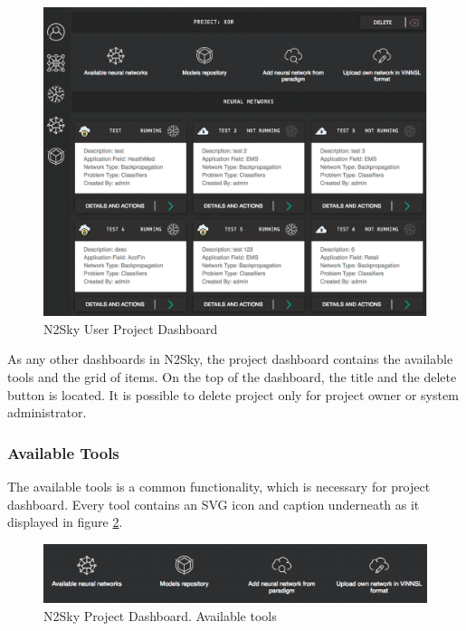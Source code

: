\begin{figure}[H]
\begin{center}
  \includegraphics[width=\linewidth]{components/5/img/projects_dsahboard.png}
  \caption{N2Sky User Project Dashboard}
  \label{fig:projects_dsahboard}
\end{center}
\end{figure}

As any other dashboards in N2Sky, the project dashboard contains the available tools and the grid of items.
On the top of the dashboard, the title and the delete button is located. It is possible to delete project only for project owner or system administrator. 

\subsubsection{Available Tools} 

The available tools is a common functionality, which is necessary for project dashboard. Every tool contains an SVG icon and caption underneath as it displayed in figure \ref{fig:projecttools}. 

\begin{figure}[htbp]
\begin{center}
  \includegraphics[width=\linewidth]{components/5/img/project_tools.png}
  \caption{N2Sky Project Dashboard. Available tools}
  \label{fig:projecttools}
\end{center}
\end{figure}

